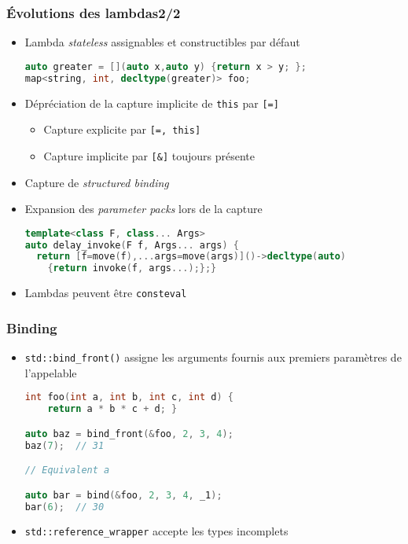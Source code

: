 \documentclass[C++.tex]{subfiles}
\begin{document}
\begin{frame}[fragile]
	\frametitle{Évolutions des lambdas\titlehfill{}2/2}
	\begin{itemize}
		\item Lambda \textit{stateless} assignables et constructibles par défaut


		\begin{lstlisting}[language=C++]
auto greater = [](auto x,auto y) {return x > y; };
map<string, int, decltype(greater)> foo;\end{lstlisting}

		\item Dépréciation de la capture implicite de \lstinline|this| par \lstinline|[=]|
		\begin{itemize}
			\item Capture explicite par \lstinline|[=, this]|
			\item Capture implicite par \lstinline|[&]| toujours présente
		\end{itemize}
		\item Capture de \textit{structured binding}
		\item Expansion des \textit{parameter packs} lors de la capture

		\begin{lstlisting}[language=C++]
template<class F, class... Args>
auto delay_invoke(F f, Args... args) {
  return [f=move(f),...args=move(args)]()->decltype(auto) 
    {return invoke(f, args...);};}\end{lstlisting}

		\item Lambdas peuvent être \lstinline|consteval|
	\end{itemize}
\end{frame}

\begin{frame}[fragile]
	\frametitle{Binding}
	\begin{itemize}
		\item \lstinline|std::bind_front()| assigne les arguments fournis aux premiers paramètres de l'appelable

	\begin{lstlisting}[language=C++]
int foo(int a, int b, int c, int d) {
	return a * b * c + d; }

auto baz = bind_front(&foo, 2, 3, 4);
baz(7);  // 31

// Equivalent a

auto bar = bind(&foo, 2, 3, 4, _1);
bar(6);  // 30\end{lstlisting}

		\item \lstinline|std::reference_wrapper| accepte les types incomplets

	\end{itemize}
\end{frame}
\end{document}
